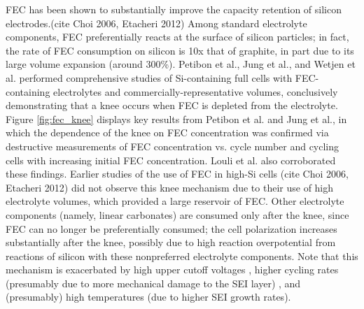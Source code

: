 \documentclass[journal=jpcl, manuscript=article, layout=onecolumn]{achemso}
\begin{document}
FEC has been shown to substantially improve the capacity retention of silicon electrodes.(cite Choi 2006, Etacheri 2012)
Among standard electrolyte components, FEC preferentially reacts at the surface of silicon particles; in fact, the rate of FEC consumption on silicon is 10x that of graphite, in part due to its large volume expansion (around 300\%).\cite{wetjen_differentiating_2017}
Petibon et al.\cite{petibon_studies_2016},
Jung et al.\cite{jung_consumption_2016},
and Wetjen et al.\cite{wetjen_differentiating_2017}
performed comprehensive studies of Si-containing full cells with FEC-containing electrolytes and commercially-representative volumes,
conclusively demonstrating that a knee occurs when FEC is depleted from the electrolyte.
Figure \ref{fig:fec_knee} displays key results from Petibon et al.\cite{petibon_studies_2016} and
Jung et al.\cite{jung_consumption_2016}, in which the dependence of the knee on FEC concentration was confirmed via destructive measurements of FEC concentration vs. cycle number\cite{petibon_studies_2016} and cycling cells with increasing initial FEC concentration\cite{jung_consumption_2016}.
Louli et al.\cite{louli_operando_2019} also corroborated these findings.
Earlier studies of the use of FEC in high-Si cells (cite Choi 2006, Etacheri 2012) did not observe this knee mechanism due to their use of high electrolyte volumes, which provided a large reservoir of FEC.
Other electrolyte components (namely, linear carbonates) are consumed only after the knee, since FEC can no longer be preferentially consumed\cite{petibon_studies_2016}; the cell polarization increases substantially after the knee\cite{petibon_studies_2016, jung_consumption_2016, wetjen_differentiating_2017}, possibly due to high reaction overpotential from reactions of silicon with these nonpreferred electrolyte components.
Note that this mechanism is exacerbated by high upper cutoff voltages \cite{petibon_studies_2016}, higher cycling rates (presumably due to more mechanical damage to the SEI layer) \cite{petibon_studies_2016}, and (presumably) high temperatures (due to higher SEI growth rates).
\end{document}
